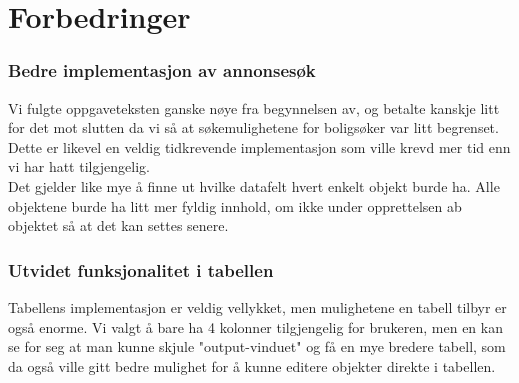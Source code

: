 \section{Forbedringer}

\subsubsection{Bedre implementasjon av annonsesøk}
Vi fulgte oppgaveteksten ganske nøye fra begynnelsen av, og betalte kanskje litt for det mot slutten da vi så at søkemulighetene for boligsøker var litt begrenset.
Dette er likevel en veldig tidkrevende implementasjon som ville krevd mer tid enn vi har hatt tilgjengelig. \\
Det gjelder like mye å finne ut hvilke datafelt hvert enkelt objekt burde ha. Alle objektene burde ha litt mer fyldig innhold, om ikke under opprettelsen ab objektet så at det kan settes senere.

\subsubsection{Utvidet funksjonalitet i tabellen}
Tabellens implementasjon er veldig vellykket, men mulighetene en tabell tilbyr er også enorme. Vi valgt å bare ha 4 kolonner tilgjengelig for brukeren, men en kan se for seg at man kunne skjule "output-vinduet" og få en mye bredere tabell, som da også ville gitt bedre mulighet for å kunne editere objekter direkte i tabellen.

\subsubsection{}
